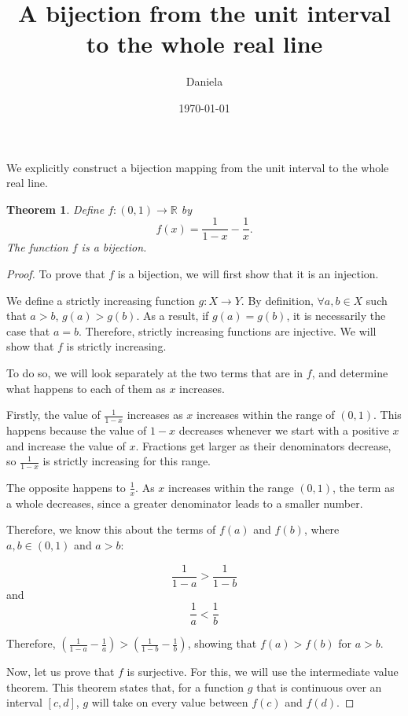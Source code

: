 \documentclass[11pt,reqno,oneside,a4paper]{article}
\title{A bijection from the unit interval to the whole real line}
\author{Daniela}
\date{\today}
\newtheorem{theorem}{Theorem}
\begin{document}
\maketitle


We explicitly construct a bijection mapping from the unit interval to the whole real line.

\begin{theorem} \label{thm:BijectionRInterval}
	Define $f : (0,1) \to \mathbb{R}$ by
	$$
		f(x) =\frac{1}{1-x} - \frac{1}{x}.
	$$
	The function $f$ is a bijection.
\end{theorem}

\begin{proof}

To prove that $f$ is a bijection, we will first show that it is an injection.

We define a strictly increasing function $g: X \rightarrow Y$. By definition, $\forall a, b \in X$ such that $a > b$, $g(a) > g(b)$. As a result, if $g(a) = g(b)$, it is necessarily the case that $a = b$. Therefore, strictly increasing functions are injective. We will show that $f$ is strictly increasing.

To do so, we will look separately at the two terms that are in $f$, and determine what happens to each of them as $x$ increases.

Firstly, the value of $\frac{1}{1-x}$ increases as $x$ increases within the range of $(0,1)$. This happens because the value of $1 - x$ decreases whenever we start with a positive $x$ and increase the value of $x$. Fractions get larger as their denominators decrease, so $\frac{1}{1-x}$ is strictly increasing for this range.

The opposite happens to $\frac{1}{x}$. As $x$ increases within the range $(0,1)$, the term as a whole decreases, since a greater denominator leads to a smaller number.

Therefore, we know this about the terms of $f(a)$ and $f(b)$, where  $a, b \in (0,1)$ and $a > b$:

$$\frac{1}{1-a} > \frac{1}{1-b} $$ 
and 
$$\frac{1}{a} < \frac{1}{b} $$

Therefore, $\left(\frac{1}{1-a} - \frac{1}{a}\right) >  \left(\frac{1}{1-b} - \frac{1}{b}\right)$, showing that $f(a) > f(b)$ for $a>b$.

Now, let us prove that $f$ is surjective. For this, we will use the intermediate value theorem. This theorem states that, for a function $g$ that is continuous over an interval $[c,d]$, $g$ will take on every value between $f(c)$ and $f(d)$. 


\end{proof}
\end{document}
